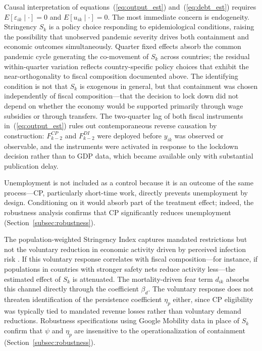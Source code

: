 \documentclass[12pt, a4paper]{article}
\begin{document}
Causal interpretation of equations~(\ref{eq:output_est}) and~(\ref{eq:debt_est}) requires $E[\varepsilon_{ik} \mid \cdot] = 0$ and $E[u_{ik} \mid \cdot] = 0$. The most immediate concern is endogeneity. Stringency $S_k$ is a policy choice responding to epidemiological conditions, raising the possibility that unobserved pandemic severity drives both containment and economic outcomes simultaneously. Quarter fixed effects absorb the common pandemic cycle generating the co-movement of $S_k$ across countries; the residual within-quarter variation reflects country-specific policy choices that exhibit the near-orthogonality to fiscal composition documented above. The identifying condition is not that $S_k$ is exogenous in general, but that containment was chosen independently of fiscal composition---that the decision to lock down did not depend on whether the economy would be supported primarily through wage subsidies or through transfers. The two-quarter lag of both fiscal instruments in~(\ref{eq:output_est}) rules out contemporaneous reverse causation by construction: $F^{CP}_{k-2}$ and $F^{DI}_{k-2}$ were deployed before $y_{ik}$ was observed or observable, and the instruments were activated in response to the lockdown decision rather than to GDP data, which became available only with substantial publication delay.

Unemployment is not included as a control because it is an outcome of the same process---CP, particularly short-time work, directly prevents unemployment by design. Conditioning on it would absorb part of the treatment effect; indeed, the robustness analysis confirms that CP significantly reduces unemployment (Section~\ref{subsec:robustness}).

The population-weighted Stringency Index captures mandated restrictions but not the voluntary reduction in economic activity driven by perceived infection risk \citep{chetty2020, GOOLSBEE2021}. If this voluntary response correlates with fiscal composition---for instance, if populations in countries with stronger safety nets reduce activity less---the estimated effect of $S_k$ is attenuated. The mortality-driven fear term $d_{ik}$ absorbs this channel directly through the coefficient $\beta_d$. The voluntary response does not threaten identification of the persistence coefficient $\eta_p$ either, since CP eligibility was typically tied to mandated revenue losses rather than voluntary demand reductions. Robustness specifications using Google Mobility data in place of $S_k$ confirm that $\psi$ and $\eta_p$ are insensitive to the operationalization of containment (Section~\ref{subsec:robustness}).
\end{document}
